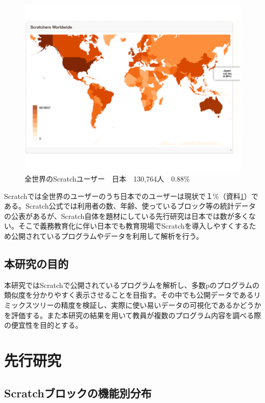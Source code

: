 \documentclass[a4paper,10pt,onecolumn,oneside,openany]{jsbook}
\begin{document}
\begin{figure}[h]
  \centering
    \includegraphics[scale=0.4]{graphic/world_japan.pdf}
  \caption{全世界のScratchユーザー　日本　130,764人　0.88\%}
  \label{num}
\end{figure}

Scratchでは全世界のユーザーのうち日本でのユーザーは現状で１\%（資料\ref{num}）である。Scratch公式では利用者の数、年齢、使っているブロック等の統計データの公表があるが、Scratch自体を題材にしている先行研究は日本では数が多くない。そこで義務教育化に伴い日本でも教育現場でScratchを導入しやすくするため公開されているプログラムやデータを利用して解析を行う。

\newpage
\section{本研究の目的}

本研究ではScratchで公開されているプログラムを解析し、多数pのプログラムの類似度を分かりやすく表示させることを目指す。その中でも公開データであるリミックスツリーの精度を検証し、実際に使い易いデータの可視化であるかどうかを評価する。また本研究の結果を用いて教員が複数のプログラム内容を調べる際の便宜性を目的とする。

\chapter{先行研究}
\section{Scratchブロックの機能別分布}
\end{document}
